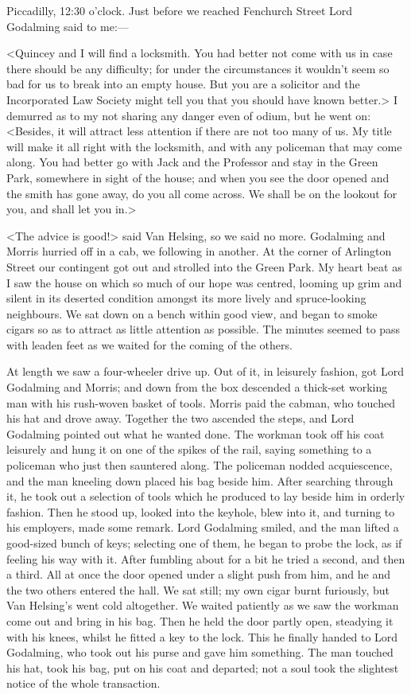 \begin{diary}{Piccadilly, 12:30 o'clock.}
Just before we reached Fenchurch Street Lord Godalming said to me:—

<Quincey and I will find a locksmith. You had better not come with us in case there should be any difficulty; for under the circumstances it wouldn't seem so bad for us to break into an empty house. But you are a solicitor and the Incorporated Law Society might tell you that you should have known better.> I demurred as to my not sharing any danger even of odium, but he went on: <Besides, it will attract less attention if there are not too many of us. My title will make it all right with the locksmith, and with any policeman that may come along. You had better go with Jack and the Professor and stay in the Green Park, somewhere in sight of the house; and when you see the door opened and the smith has gone away, do you all come across. We shall be on the lookout for you, and shall let you in.>

<The advice is good!> said Van Helsing, so we said no more. Godalming and Morris hurried off in a cab, we following in another. At the corner of Arlington Street our contingent got out and strolled into the Green Park. My heart beat as I saw the house on which so much of our hope was centred, looming up grim and silent in its deserted condition amongst its more lively and spruce-looking neighbours. We sat down on a bench within good view, and began to smoke cigars so as to attract as little attention as possible. The minutes seemed to pass with leaden feet as we waited for the coming of the others.

At length we saw a four-wheeler drive up. Out of it, in leisurely fashion, got Lord Godalming and Morris; and down from the box descended a thick-set working man with his rush-woven basket of tools. Morris paid the cabman, who touched his hat and drove away. Together the two ascended the steps, and Lord Godalming pointed out what he wanted done. The workman took off his coat leisurely and hung it on one of the spikes of the rail, saying something to a policeman who just then sauntered along. The policeman nodded acquiescence, and the man kneeling down placed his bag beside him. After searching through it, he took out a selection of tools which he produced to lay beside him in orderly fashion. Then he stood up, looked into the keyhole, blew into it, and turning to his employers, made some remark. Lord Godalming smiled, and the man lifted a good-sized bunch of keys; selecting one of them, he began to probe the lock, as if feeling his way with it. After fumbling about for a bit he tried a second, and then a third. All at once the door opened under a slight push from him, and he and the two others entered the hall. We sat still; my own cigar burnt furiously, but Van Helsing's went cold altogether. We waited patiently as we saw the workman come out and bring in his bag. Then he held the door partly open, steadying it with his knees, whilst he fitted a key to the lock. This he finally handed to Lord Godalming, who took out his purse and gave him something. The man touched his hat, took his bag, put on his coat and departed; not a soul took the slightest notice of the whole transaction.


\end{diary}
